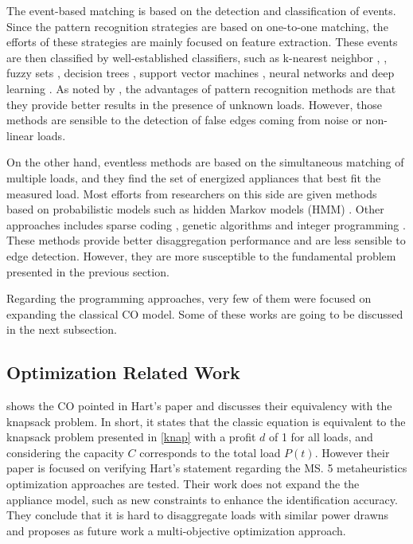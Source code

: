 The event-based  matching  is  based  on  the  detection  and  classification  of  events. Since the pattern recognition strategies are based on one-to-one matching, the efforts of these strategies are mainly focused on feature extraction. These events are then classified by well-established classifiers, such as k-nearest neighbor \cite{Figueiredo2011}, \cite{berges2009, Froehlich2010}, fuzzy sets \cite{lin2011, ducange2014}, decision trees \cite{Nguyen2015, gillis2016}, support vector machines \cite{duarte2012, zoha2012}, neural networks \cite{zhou2016, bian2016} and deep learning \cite{mauch2016, jack2015}. As noted by \cite{zeifman}, the advantages of pattern recognition methods are that they provide better results in the presence of unknown loads. However, those methods are sensible to the detection of false edges coming from noise or non-linear loads.

On the other hand, eventless methods are based on the simultaneous matching of multiple loads, and they find the set of energized appliances that best fit the measured load. Most efforts from researchers on this side are given methods based on probabilistic models such as hidden Markov models (HMM) \cite{afhmm, reed, hmm_unsup, stephen_hmm}. Other approaches includes sparse coding \cite{sparse_kolter, nmf}, genetic algorithms \cite{meta} and integer programming \cite{suzuki, bhotto2016}. These methods provide better disaggregation performance \cite{zeifman} and are less sensible to edge detection. However, they are more susceptible to the fundamental problem presented in the previous section. 

Regarding the programming approaches, very few of them were focused on expanding the classical CO model. Some of these works are going to be discussed in the next subsection.  

\subsection{Optimization Related Work}

\cite{meta} shows the CO pointed in Hart's paper and discusses their equivalency with the knapsack problem. In short, it states that the classic equation is equivalent to the knapsack problem presented in \ref{knap} with a profit $d$ of 1 for all loads, and considering the capacity $C$ corresponds to the total load $P(t)$. However their paper is focused on verifying Hart’s statement regarding the MS. 5 metaheuristics optimization approaches are tested. Their work does not expand the the appliance model, such as new constraints to enhance the identification accuracy. They conclude that it is hard to disaggregate loads with similar power drawns and proposes as future work a multi-objective optimization approach.

